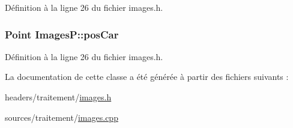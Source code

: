 Définition à la ligne 26 du fichier images.\-h.

\hypertarget{class_images_p_a79d1d01bae703caeee1033425e4f8f18}{
\subsubsection[{pos\-Car}]{\setlength{\rightskip}{0pt plus 5cm}Point Images\-P\-::pos\-Car}}\label{class_images_p_a79d1d01bae703caeee1033425e4f8f18}


Définition à la ligne 26 du fichier images.\-h.



La documentation de cette classe a été générée à partir des fichiers suivants \-:\begin{DoxyCompactItemize}
\item 
headers/traitement/\hyperlink{images_8h}{images.\-h}\item 
sources/traitement/\hyperlink{images_8cpp}{images.\-cpp}\end{DoxyCompactItemize}
